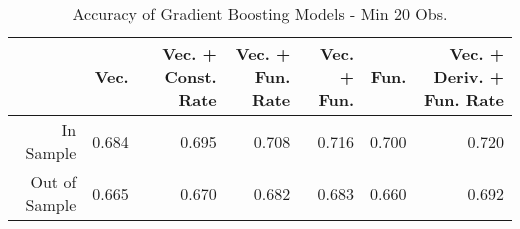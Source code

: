 \begin{table}[ht]
\centering
\begin{tabular}{rrrrrrr}
  \hline
 & Vec. & Vec. + Const. Rate & Vec. + Fun. Rate & Vec. + Fun. & Fun. & Vec. + Deriv. + Fun. Rate \\ 
  \hline
In Sample & 0.684 & 0.695 & 0.708 & 0.716 & 0.700 & 0.720 \\ 
  Out of Sample & 0.665 & 0.670 & 0.682 & 0.683 & 0.660 & 0.692 \\ 
   \hline
\end{tabular}
\caption{Accuracy of Gradient Boosting Models - Min 20 Obs.} 
\label{gbm_20obs_acc}
\end{table}

